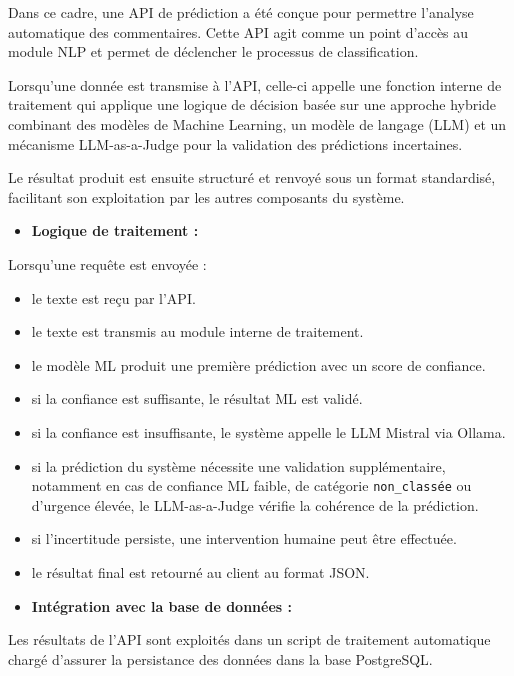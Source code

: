 \documentclass[12pt,a4paper,oneside]{report}
\begin{document}
Dans ce cadre, une API de prédiction a été conçue pour permettre l’analyse automatique des commentaires. Cette API agit comme un point d’accès au module NLP et permet de déclencher le processus de classification.

Lorsqu’une donnée est transmise à l’API, celle-ci appelle une fonction interne de traitement qui applique une logique de décision basée sur une approche hybride combinant des modèles de Machine Learning, un modèle de langage (LLM) et un mécanisme LLM-as-a-Judge pour la validation des prédictions incertaines.

Le résultat produit est ensuite structuré et renvoyé sous un format standardisé, facilitant son exploitation par les autres composants du système.

\begin{itemize}
    \item \textbf{Logique de traitement :}
\end{itemize}
\vspace{0.3cm}
Lorsqu’une requête est envoyée :
\begin{itemize}
    \item le texte est reçu par l’API.
    \item le texte est transmis au module interne de traitement.
    \item le modèle ML produit une première prédiction avec un score de confiance.
    \item si la confiance est suffisante, le résultat ML est validé.
    \item si la confiance est insuffisante, le système appelle le LLM Mistral via Ollama.
    \item si la prédiction du système nécessite une validation supplémentaire, notamment en cas de confiance ML faible, de catégorie \texttt{non\_classée} ou d’urgence élevée, le LLM-as-a-Judge vérifie la cohérence de la prédiction.
    \item si l’incertitude persiste, une intervention humaine peut être effectuée.
    \item le résultat final est retourné au client au format JSON.
\end{itemize}


\vspace{0.3cm}
\begin{itemize}
    \item \textbf{Intégration avec la base de données :}
\end{itemize}
\vspace{0.3cm}
Les résultats de l’API sont exploités dans un script de traitement automatique chargé d’assurer la persistance des données dans la base PostgreSQL.
\end{document}
